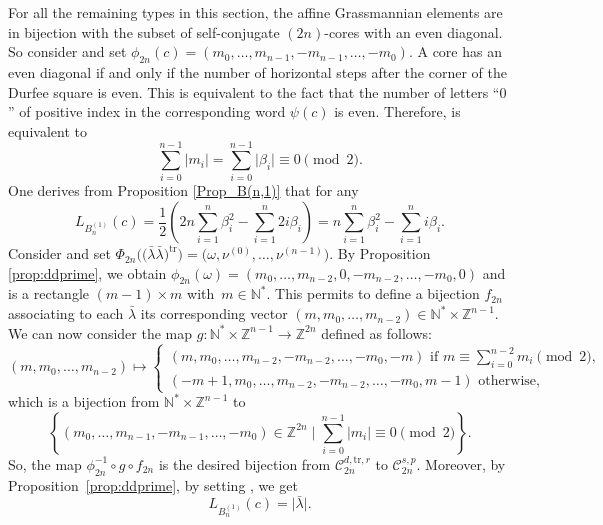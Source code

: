 \documentclass[pdftex]{sigma}
\numberwithin{equation}{section}
\newcommand{\cC}{\mathcal{C}}
\newcommand{\Z}{\mathbb{Z}}
\newcommand{\N}{\mathbb{N}}
\begin{document}
For all the remaining types in this section, the affine Grassmannian
elements are in bijection with the subset \smash{$\cC_{2n}^{s,p}$} of self-conjugate
$(2n)$-cores with an even diagonal. So consider \smash{$c\in \cC_{2n}^{s,p}$} and set  $%
\phi _{2n}(c)=(m_{0},\dots ,m_{n-1},-m_{n-1},\dots ,-m_{0})$. A core has an
even diagonal if and only if the number of horizontal steps after the corner
of the Durfee square is even. This is equivalent to the fact that the number
of letters ``$0$'' of positive index in the corresponding word $\psi (c)$ is
even. Therefore, \smash{$c\in \cC_{2n}^{s,p}$} is equivalent to
\begin{equation*}
\sum_{i=0}^{n-1}\lvert m_{i}\rvert =\sum_{i=0}^{n-1}\lvert \beta _{i}\rvert
\equiv 0\pmod{2}.
\end{equation*}%
One derives from Proposition \ref{Prop_B(n,1)} that for any 
\begin{equation*}
L_{B_{n}^{(1)}}(c)=\frac{1}{2}\left( 2n\sum_{i=1}^{n}\beta
_{i}^{2}-\sum_{i=1}^{n}2i\beta _{i}\right) =n\sum_{i=1}^{n}\beta
_{i}^{2}-\sum_{i=1}^{n}i\beta _{i}.
\end{equation*}%
Consider \smash{$\bar{\lambda}\in \cC_{2n}^{d,\mathrm{tr},r}$} and set $\Phi _{2n}\bigl(\bigl(%
\bar{\lambda}\bar{\lambda}\bigr)^{\mathrm{tr}}\bigr)=\bigl( \omega ,\nu ^{(0)},\dots
,\nu ^{(n-1)}\bigr)$. By Proposition \ref{prop:ddprime}, we obtain  $\phi
_{2n}(\omega )=(m_{0},\dots ,m_{n-2},0,-m_{n-2},\dots ,-m_{0},0)$ and  is a rectangle $(m-1)\times m$ with~${m\in \N^{\ast }}$. This
permits to define a bijection $f_{2n}$ associating to each $\bar{\lambda}$
its corresponding vector $(m,m_{0},\dots ,m_{n-2})\in \N^{\ast }\times \Z%
^{n-1}$.
We can now consider the map $g\colon \N^{\ast }\times \Z^{n-1} \rightarrow  \Z^{2n} $ defined as follows:
\begin{equation*}
 (m,m_{0},\dots ,m_{n-2})  \mapsto
\begin{cases}
\displaystyle (m,m_{0},\dots ,m_{n-2},-m_{n-2},\dots ,-m_{0},-m)\text{ if }m\equiv
\sum_{i=0}^{n-2}m_{i}\pmod{2}, \\
(-m+1,m_{0},\dots ,m_{n-2},-m_{n-2},\dots ,-m_{0},m-1)\text{ otherwise,}
\end{cases}
\end{equation*}%
which is a bijection from $\N^{\ast }\times \Z^{n-1}$ to
\begin{equation*}
\left\{(m_{0},\dots ,m_{n-1},-m_{n-1},\dots ,-m_{0})\in \Z^{2n}\mid
\sum_{i=0}^{n-1}\lvert m_{i}\rvert \equiv 0\pmod{2}\right\}.
\end{equation*}%
So, the map $\phi _{2n}^{-1}\circ g\circ f_{2n}$ is the desired bijection
from $\cC_{2n}^{d,\mathrm{tr},r}$ to $\cC_{2n}^{s,p}$. Moreover, by
Proposition~\ref{prop:ddprime}, by setting , we get
\begin{equation*}
L_{B_{n}^{(1)}}(c)=\bigl\lvert \bar{\lambda}\bigr\rvert .
\end{equation*}
\end{document}
